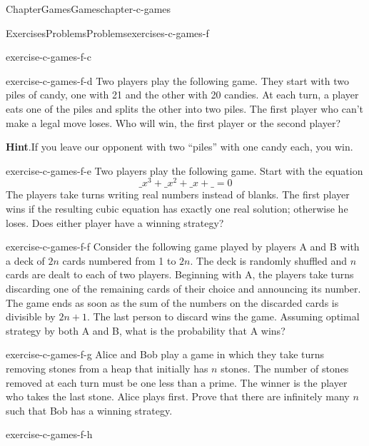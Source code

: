 \documentclass[oneside,10pt,]{book}
\newcommand{\blocktitlefont}{\relax}
\numberwithin{equation}{section}
\begin{document}
\begin{chapterptx}{Chapter}{Games}{}{Games}{}{}{chapter-c-games}
\begin{exercises-section}{Exercises}{Problems}{}{Problems}{}{}{exercises-c-games-f}
\begin{divisionexercise}{2}{}{}{exercise-c-games-f-c}
\end{divisionexercise}%
\begin{divisionexercise}{3}{}{}{exercise-c-games-f-d}%
Two players play the following game. They start with two piles of candy, one with 21 and the other with 20 candies. At each turn, a player eats one of the piles and splits the other into two piles. The first player who can't make a legal move loses. Who will win, the first player or the second player?%
\par\smallskip%
\noindent\textbf{\blocktitlefont Hint}.\hypertarget{hint-c-games-f-d-b}{}\quad{}If you leave our opponent with two ``piles'' with one candy each, you win.%
\end{divisionexercise}%
\begin{divisionexercise}{4}{}{}{exercise-c-games-f-e}%
Two players play the following game. Start with the equation%
\begin{equation*}
\_ x^3 + \_ x^2 + \_ x + \_= 0
\end{equation*}
The players take turns writing real numbers instead of blanks. The first player wins if the resulting cubic equation has exactly one real solution; otherwise he loses. Does either player have a winning strategy?%
\end{divisionexercise}%
\begin{divisionexercise}{5}{}{}{exercise-c-games-f-f}%
Consider the following game played by players A and B with a deck of \(2n\) cards numbered from 1 to \(2n\). The deck is randomly shuffled and \(n\) cards are dealt to each of two players. Beginning with A, the players take turns discarding one of the remaining cards of their choice and announcing its number. The game ends as soon as the sum of the numbers on the discarded cards is divisible by \(2n + 1\). The last person to discard wins the game. Assuming optimal strategy by both A and B, what is the probability that A wins?%
\end{divisionexercise}%
\begin{divisionexercise}{6}{}{}{exercise-c-games-f-g}%
Alice and Bob play a game in which they take turns removing stones from a heap that initially has \(n\) stones. The number of stones removed at each turn must be one less than a prime. The winner is the player who takes the last stone. Alice plays first. Prove that there are infinitely many \(n\) such that Bob has a winning strategy.%
\end{divisionexercise}%
\begin{divisionexercise}{7}{}{}{exercise-c-games-f-h}%

\end{divisionexercise}
\end{exercises-section}
\end{chapterptx}
\end{document}
